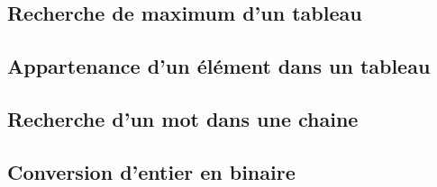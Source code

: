 \documentclass[10pt,fleqn]{article} %
\begin{document}
\graphicspath{{../../../style/png/}{images/}}


\def\xxactivite{Applications}
\def\xxauteur{\textsl{É. Durif -- X. Pessoles -- J.-P. Berne}}



\def\xxYCartouche{-2.25cm}
\def\xxYongletGarde{.5cm}
\def\xxYOnget{.9cm}



%

\setlength{\columnseprule}{.1pt}

\pagestyle{fancy}
\thispagestyle{plain}


\vspace{3.5cm}

\def\columnseprulecolor{\color{ocre}}
\setlength{\columnseprule}{0.4pt} 



\vspace{3cm}
\subsection{Recherche de maximum d'un tableau}
\setcounter{numques}{0}

\subsection{Appartenance d'un élément dans un tableau}
\setcounter{numques}{0}

\subsection{Recherche d'un mot dans une chaine}
\setcounter{numques}{0}

\subsection{Conversion d'entier en binaire}
\setcounter{numques}{0}

\end{document}
